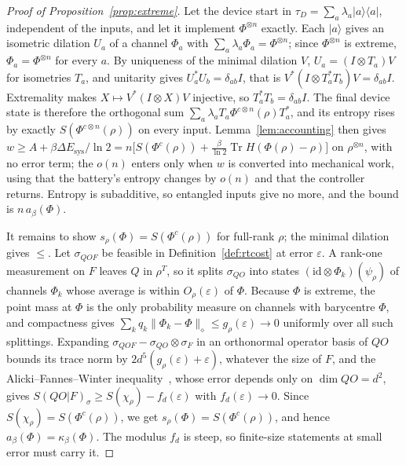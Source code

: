 \documentclass[11pt]{article}
\theoremstyle{definition}
\theoremstyle{remark}
\newcommand{\Tr}{\operatorname{Tr}}
\newcommand{\Trt}{\kappa_\beta}
\begin{document}
\begin{proof}[Proof of Proposition~\ref{prop:extreme}]
Let the device start in $\tau_D=\sum_a\lambda_a|a\rangle\langle a|$, independent of the inputs, and let it implement $\Phi^{\otimes n}$ exactly. Each $|a\rangle$ gives an isometric dilation $U_a$ of a channel $\Phi_a$ with $\sum_a\lambda_a\Phi_a=\Phi^{\otimes n}$; since $\Phi^{\otimes n}$ is extreme, $\Phi_a=\Phi^{\otimes n}$ for every $a$. By uniqueness of the minimal dilation $V$, $U_a=(I\otimes T_a)V$ for isometries $T_a$, and unitarity gives $U_a^*U_b=\delta_{ab}I$, that is $V^*(I\otimes T_a^*T_b)V=\delta_{ab}I$. Extremality makes $X\mapsto V^*(I\otimes X)V$ injective, so $T_a^*T_b=\delta_{ab}I$. The final device state is therefore the orthogonal sum $\sum_a\lambda_aT_a\Phi^{c\otimes n}(\rho)T_a^*$, and its entropy rises by exactly $S(\Phi^{c\otimes n}(\rho))$ on every input. Lemma~\ref{lem:accounting} then gives $w\ge A+\beta\Delta E_{\mathrm{sys}}/\ln2=n\bigl[S(\Phi^c(\rho))+\tfrac{\beta}{\ln2}\Tr H(\Phi(\rho)-\rho)\bigr]$ on $\rho^{\otimes n}$, with no error term; the $o(n)$ enters only when $w$ is converted into mechanical work, using that the battery's entropy changes by $o(n)$ and that the controller returns. Entropy is subadditive, so entangled inputs give no more, and the bound is $n\,a_\beta(\Phi)$.

It remains to show $s_\rho(\Phi)=S(\Phi^c(\rho))$ for full-rank $\rho$; the minimal dilation gives $\le$. Let $\sigma_{QOF}$ be feasible in Definition~\ref{def:rtcost} at error $\varepsilon$. A rank-one measurement on $F$ leaves $Q$ in $\rho^T$, so it splits $\sigma_{QO}$ into states $(\mathrm{id}\otimes\Phi_k)(\psi_\rho)$ of channels $\Phi_k$ whose average is within $O_\rho(\varepsilon)$ of $\Phi$. Because $\Phi$ is extreme, the point mass at $\Phi$ is the only probability measure on channels with barycentre $\Phi$, and compactness gives $\sum_kq_k\|\Phi_k-\Phi\|_\diamond\le g_\rho(\varepsilon)\to0$ uniformly over all such splittings. Expanding $\sigma_{QOF}-\sigma_{QO}\otimes\sigma_F$ in an orthonormal operator basis of $QO$ bounds its trace norm by $2d^5(g_\rho(\varepsilon)+\varepsilon)$, whatever the size of $F$, and the Alicki--Fannes--Winter inequality~\cite{Winter16}, whose error depends only on $\dim QO=d^2$, gives $S(QO|F)_\sigma\ge S(\chi_\rho)-f_d(\varepsilon)$ with $f_d(\varepsilon)\to0$. Since $S(\chi_\rho)=S(\Phi^c(\rho))$, we get $s_\rho(\Phi)=S(\Phi^c(\rho))$, and hence $a_\beta(\Phi)=\Trt(\Phi)$. The modulus $f_d$ is steep, so finite-size statements at small error must carry it.
\end{proof}
\end{document}
